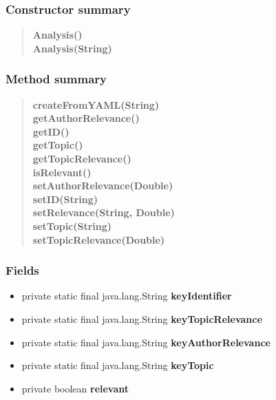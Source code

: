 {{\subsubsection{Constructor summary}{
\begin{verse}
{\bf Analysis()} \\
{\bf Analysis(String)} \\
\end{verse}
}
\subsubsection{Method summary}{
\begin{verse}
{\bf createFromYAML(String)} \\
{\bf getAuthorRelevance()} \\
{\bf getID()} \\
{\bf getTopic()} \\
{\bf getTopicRelevance()} \\
{\bf isRelevant()} \\
{\bf setAuthorRelevance(Double)} \\
{\bf setID(String)} \\
{\bf setRelevance(String, Double)} \\
{\bf setTopic(String)} \\
{\bf setTopicRelevance(Double)} \\
\end{verse}
}
\subsubsection{Fields}{
\begin{itemize}
\item{
\label{amber.common.Analysis.keyIdentifier}private static final java.lang.String {\bf keyIdentifier}}
\item{
\label{amber.common.Analysis.keyTopicRelevance}private static final java.lang.String {\bf keyTopicRelevance}}
\item{
\label{amber.common.Analysis.keyAuthorRelevance}private static final java.lang.String {\bf keyAuthorRelevance}}
\item{
\label{amber.common.Analysis.keyTopic}private static final java.lang.String {\bf keyTopic}}
\item{
\label{amber.common.Analysis.relevant}private boolean {\bf relevant}}
\end{itemize}
}
}}
